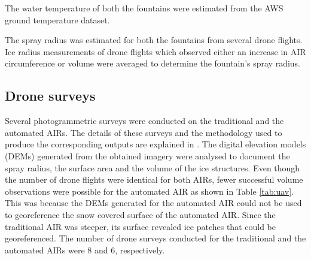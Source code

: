 \documentclass[tc, manuscript]{copernicus}
\begin{document}
The water temperature of both the fountains were estimated from the AWS ground temperature dataset.

The spray radius was estimated for both the fountains from several drone flights. Ice radius measurements of
drone flights which observed either an increase in AIR circumference or volume were averaged to determine the
fountain's spray radius.

\subsection{Drone surveys}

Several photogrammetric surveys were conducted on the traditional and the automated AIRs. The details of these
surveys and the methodology used to produce the corresponding outputs are explained in
\cite{balasubramanianInfluenceMeteorologicalConditions2022}. The digital elevation models (DEMs) generated from
the obtained imagery were analysed to document the spray radius, the surface area and the volume of the ice
structures. Even though the number of drone flights were identical for both AIRs, fewer successful volume
observations were possible for the automated AIR as shown in Table \ref{tab:uav}. This was because the DEMs
generated for the automated AIR could not be used to georeference the snow covered surface of the automated
AIR. Since the traditional AIR was steeper, its surface revealed ice patches that could be georeferenced. The
number of drone surveys conducted for the traditional and the automated AIRs were 8 and 6, respectively. 
\end{document}
